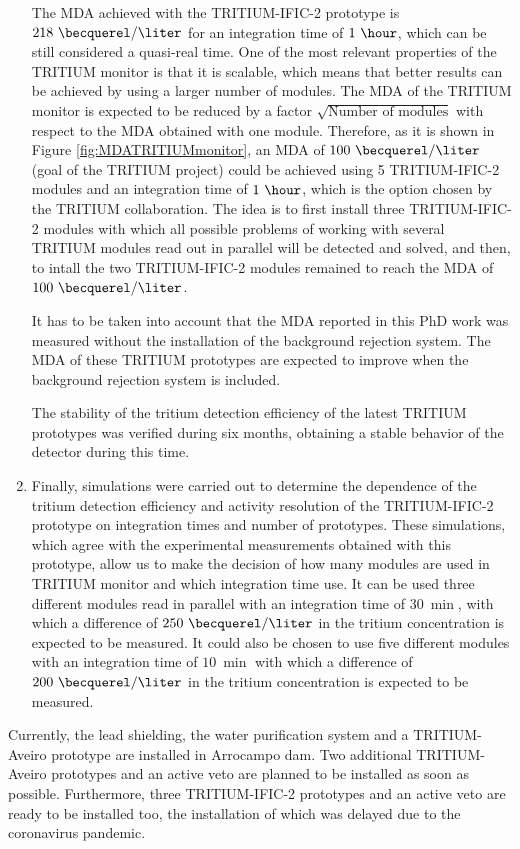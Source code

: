 \begin{enumerate}
\begin{itemize}
\end{itemize}

The MDA achieved with the TRITIUM-IFIC-2 prototype is $218~\becquerel/\liter$ for an integration time of $1~\hour$, which can be still considered a quasi-real time. One of the most relevant properties of the TRITIUM monitor is that it is scalable, which means that better results can be achieved by using a larger number of modules. The MDA of the TRITIUM monitor is expected to be reduced by a factor $\sqrt{\text{Number of modules}}$ with respect to the MDA obtained with one module. Therefore, as it is shown in Figure \ref{fig:MDATRITIUMmonitor}, an MDA of  $100~\becquerel/\liter$ (goal of the TRITIUM project) could be achieved using 5 TRITIUM-IFIC-2 modules and an integration time of $1~\hour$, which is the option chosen by the TRITIUM collaboration. The idea is to first install three TRITIUM-IFIC-2 modules with which all possible problems of working with several TRITIUM modules read out in parallel will be detected and solved, and then, to intall the two TRITIUM-IFIC-2 modules remained to reach the MDA of $100~\becquerel/\liter$.

It has to be taken into account that the MDA reported in this PhD work was measured without the installation of the background rejection system. The MDA of these TRITIUM prototypes are expected to improve when the background rejection system is included.

The stability of the tritium detection efficiency of the latest TRITIUM prototypes was verified during six months, obtaining a stable behavior of the detector during this time.

\item{} Finally, simulations were carried out to determine the dependence of the tritium detection efficiency and activity resolution of the TRITIUM-IFIC-2 prototype on integration times and number of prototypes. These simulations, which agree with the experimental measurements obtained with this prototype, allow us to make the decision of how many modules are used in TRITIUM monitor and which integration time use. It can be used three different modules read in parallel with an integration time of $30~\min$, with which a difference of $250~\becquerel/\liter$ in the tritium concentration is expected to be measured. It could also be chosen to use five different modules with an integration time of $10~\min$ with which a difference of $200~\becquerel/\liter$ in the tritium concentration is expected to be measured.

\end{enumerate}

Currently, the lead shielding, the water purification system and a TRITIUM-Aveiro prototype are installed in Arrocampo dam. Two additional TRITIUM-Aveiro prototypes and an active veto are planned to be installed as soon as possible. Furthermore, three TRITIUM-IFIC-2 prototypes and an active veto are ready to be installed too, the installation of which was delayed due to the coronavirus pandemic.